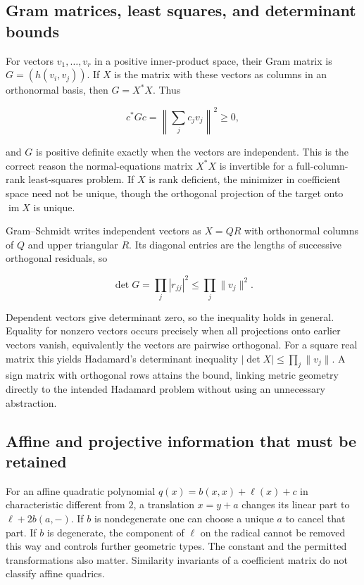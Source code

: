 \documentclass[
  11pt,
]{article}
\begin{document}
\subsection{Gram matrices, least squares, and determinant
bounds}\label{gram-matrices-least-squares-and-determinant-bounds}

For vectors \(v_1,\ldots,v_r\) in a positive inner-product space, their
Gram matrix is \(G=(h(v_i,v_j))\). If \(X\) is the matrix with these
vectors as columns in an orthonormal basis, then \(G=X^*X\). Thus

\[c^*Gc=\left\|\sum_jc_jv_j\right\|^2\ge0,\]

and \(G\) is positive definite exactly when the vectors are independent.
This is the correct reason the normal-equations matrix \(X^*X\) is
invertible for a full-column-rank least-squares problem. If \(X\) is
rank deficient, the minimizer in coefficient space need not be unique,
though the orthogonal projection of the target onto
\(\operatorname{im}X\) is unique.

Gram--Schmidt writes independent vectors as \(X=QR\) with orthonormal
columns of \(Q\) and upper triangular \(R\). Its diagonal entries are
the lengths of successive orthogonal residuals, so

\[\det G=\prod_j|r_{jj}|^2\le\prod_j\|v_j\|^2.\]

Dependent vectors give determinant zero, so the inequality holds in
general. Equality for nonzero vectors occurs precisely when all
projections onto earlier vectors vanish, equivalently the vectors are
pairwise orthogonal. For a square real matrix this yields Hadamard's
determinant inequality \(|\det X|\le\prod_j\|v_j\|\). A sign matrix with
orthogonal rows attains the bound, linking metric geometry directly to
the intended Hadamard problem without using an unnecessary abstraction.

\subsection{Affine and projective information that must be
retained}\label{affine-and-projective-information-that-must-be-retained}

For an affine quadratic polynomial \(q(x)=b(x,x)+\ell(x)+c\) in
characteristic different from \(2\), a translation \(x=y+a\) changes its
linear part to \(\ell+2b(a,-)\). If \(b\) is nondegenerate one can
choose a unique \(a\) to cancel that part. If \(b\) is degenerate, the
component of \(\ell\) on the radical cannot be removed this way and
controls further geometric types. The constant and the permitted
transformations also matter. Similarity invariants of a coefficient
matrix do not classify affine quadrics.
\end{document}

